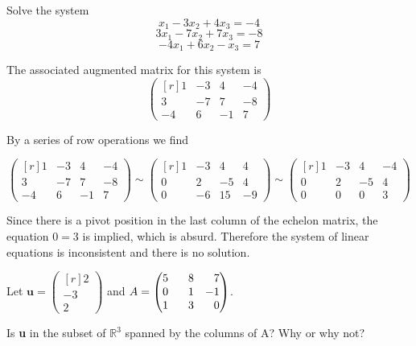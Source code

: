 \documentclass[11pt, oneside]{article}   	%
\begin{document}
\begin{tcolorbox}[title=\textbf{1.1.12}]
Solve the system
\[x_1- 3x_2+4x_3=-4\]
\[3x_1-7x_2+7x_3=-8\]
\[-4x_1+6x_2-x_3=7\]
\end{tcolorbox}
The associated augmented matrix for this system is 
\[
\begin{pmatrix*}[r]
1&-3&4&-4\\
3&-7&7&-8\\
-4&6&-1&7\end{pmatrix*}
\]

By a series of row operations we find 

\[
\begin{pmatrix*}[r]
1&-3&4&-4\\
3&-7&7&-8\\
-4&6&-1&7\end{pmatrix*}
\sim \begin{pmatrix*}[r]
1&-3&4&4\\
0&2&-5&4\\
0&-6&15&-9\end{pmatrix*}
\sim \begin{pmatrix*}[r]
1&-3&4&-4\\
0&2&-5&4\\
0&0&0&3\end{pmatrix*}
\]

Since there is a pivot position in the last column of the echelon matrix, the equation $0=3$ is implied, which is absurd. Therefore the system of linear equations is inconsistent and there is no solution.

\clearpage
\begin{tcolorbox}[title=\textbf{1.4.14}]
\begin{center}
Let $\textbf{u}=\begin{pmatrix*}[r]
2\\
-3\\
2\end{pmatrix*}$ and $A=\begin{pmatrix*}[r]
5&8&7\\
0&\hphantom{-}1&-1\\
1&3&0\end{pmatrix*}$. 
\end{center}

\vspace{5 mm}

Is \textbf{u} in the subset of $\mathbb{R}^3$ spanned by the columns of A? Why or why not?
\end{tcolorbox}
\end{document}
